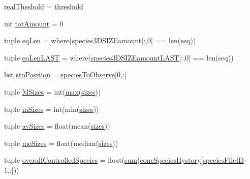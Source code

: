 \begin{DoxyCompactItemize}
\item 
\hyperlink{namespacegeneral_statistics_a4403e02b267a59338d77f9a53f9893c2}{real\-Theshold} = \hyperlink{namespacegeneral_statistics_a155d64c28850cab0f82a1476f73c376d}{threshold}
\item 
int \hyperlink{namespacegeneral_statistics_a5d195c38bf488e92ee6250184c903b13}{tot\-Amount} = 0
\item 
tuple \hyperlink{namespacegeneral_statistics_ad6743c4b3941567c5169875b866b00ea}{eq\-Len} = where(\hyperlink{namespacegeneral_statistics_a49505b471d187739723d5212c07a7a0a}{species3\-D\-S\-I\-Z\-Eamount}\mbox{[}\-:,0\mbox{]} == len(seq))
\item 
tuple \hyperlink{namespacegeneral_statistics_a7b6c4c854f530c8f42d2e6cf8c76d40f}{eq\-Len\-L\-A\-S\-T} = where(\hyperlink{namespacegeneral_statistics_a34b463634037dcf1dff3e5c03eb9d169}{species3\-D\-S\-I\-Z\-Eamount\-L\-A\-S\-T}\mbox{[}\-:,0\mbox{]} == len(seq))
\item 
list \hyperlink{namespacegeneral_statistics_ad6f78bf5f1f1301baa9e3ecd82fe10c1}{sto\-Position} = \hyperlink{namespacegeneral_statistics_acfada06fea0c10e3f1eea8b9cdde37e3}{species\-To\-Observe}\mbox{[}0,\-:\mbox{]}
\item 
tuple \hyperlink{namespacegeneral_statistics_a72c855982b631ffb69610244f533662e}{\-M\-Sizes} = int(\hyperlink{crea__e__controlla__i__catalizzatori_8m_a6d9c24e62aee61f54530163edf684ae2}{max}(\hyperlink{namespacegeneral_statistics_a2ddfeb15247fcd76c5799776c251d274}{sizes}))
\item 
tuple \hyperlink{namespacegeneral_statistics_a0e29f06b06068607b9235006b7b63367}{m\-Sizes} = int(min(\hyperlink{namespacegeneral_statistics_a2ddfeb15247fcd76c5799776c251d274}{sizes}))
\item 
tuple \hyperlink{namespacegeneral_statistics_ad7622b488c1a4fa5f072b59f0bdd0f51}{av\-Sizes} = float(mean(\hyperlink{namespacegeneral_statistics_a2ddfeb15247fcd76c5799776c251d274}{sizes}))
\item 
tuple \hyperlink{namespacegeneral_statistics_a1cadfe43529f9c53e77c9b1371463c0b}{me\-Sizes} = float(median(\hyperlink{namespacegeneral_statistics_a2ddfeb15247fcd76c5799776c251d274}{sizes}))
\item 
tuple \hyperlink{namespacegeneral_statistics_a329d09d383e53e22ade6723b35e103d8}{overall\-Controlled\-Species} = float(\hyperlink{crea__influx_8m_a59a869fb2b28d56dacd91c09e1dffc8d}{sum}(\hyperlink{namespacegeneral_statistics_a900d9e27b938468e0d244dbb49d7111c}{conc\-Species\-Hystory}\mbox{[}\hyperlink{namespacegeneral_statistics_a6b94bc4781eb4017a82145d7e6260e61}{species\-File\-I\-D}-\/1,\-:\mbox{]}))

\end{DoxyCompactItemize}
